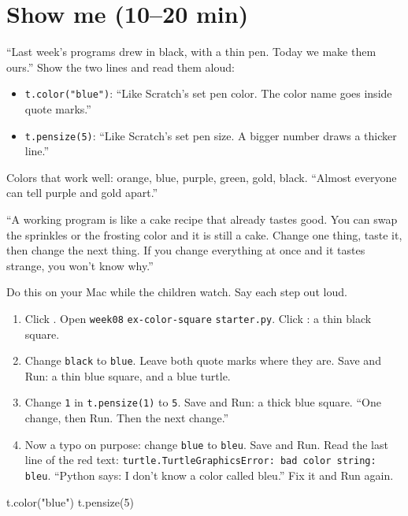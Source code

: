 \section{Show me (10--20 min)}
\begin{teacherscript}
\enquote{Last week's programs drew in black, with a thin pen. Today we make them ours.} Show the two lines and read them aloud:
\begin{itemize}[leftmargin=1.2em,itemsep=1pt]
  \item \texttt{t.color("blue")}: \enquote{Like Scratch's set pen color. The color name goes inside quote marks.}
  \item \texttt{t.pensize(5)}: \enquote{Like Scratch's set pen size. A bigger number draws a thicker line.}
\end{itemize}
Colors that work well: orange, blue, purple, green, gold, black. \enquote{Almost everyone can tell purple and gold apart.}
\end{teacherscript}

\begin{analogy}
\enquote{A working program is like a cake recipe that already tastes good. You can swap the sprinkles or the frosting color and it is still a cake. Change one thing, taste it, then change the next thing. If you change everything at once and it tastes strange, you won't know why.}
\end{analogy}

\begin{workedexample}
Do this on your Mac while the children watch. Say each step out loud.
\begin{enumerate}[leftmargin=1.4em,itemsep=1pt]
  \item Click . Open \texttt{week08} \textrightarrow{} \texttt{ex-color-square} \textrightarrow{} \texttt{starter.py}. Click : a thin black square.
  \item Change \texttt{black} to \texttt{blue}. Leave both quote marks where they are. Save and Run: a thin blue square, and a blue turtle.
  \item Change \texttt{1} in \texttt{t.pensize(1)} to \texttt{5}. Save and Run: a thick blue square. \enquote{One change, then Run. Then the next change.}
  \item Now a typo on purpose: change \texttt{blue} to \texttt{bleu}. Save and Run. Read the last line of the red text: \texttt{turtle.TurtleGraphicsError: bad color string: bleu}. \enquote{Python says: I don't know a color called bleu.} Fix it and Run again.
\end{enumerate}
\begin{pycode}
t.color("blue")
t.pensize(5)
\end{pycode}
\end{workedexample}


